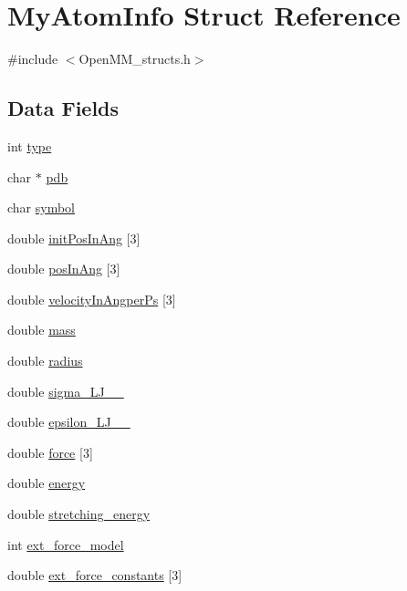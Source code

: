 \hypertarget{structMyAtomInfo}{}\section{My\+Atom\+Info Struct Reference}
\label{structMyAtomInfo}


{\ttfamily \#include $<$Open\+M\+M\+\_\+structs.\+h$>$}

\subsection*{Data Fields}
\begin{DoxyCompactItemize}
\item 
int \mbox{\hyperlink{structMyAtomInfo_aed11c9319e0ba5fd5d1d853393e5ca2a}{type}}
\item 
char $\ast$ \mbox{\hyperlink{structMyAtomInfo_a09e8a3f74dab18cb91d1262f8947d8e5}{pdb}}
\item 
char \mbox{\hyperlink{structMyAtomInfo_a89b16d994ac86606e6d73cf9fabe2b95}{symbol}}
\item 
double \mbox{\hyperlink{structMyAtomInfo_a8baed26db4167ce38492d90f2b2d313f}{init\+Pos\+In\+Ang}} \mbox{[}3\mbox{]}
\item 
double \mbox{\hyperlink{structMyAtomInfo_a3abe1ccbf133ad5722c6c0166127fced}{pos\+In\+Ang}} \mbox{[}3\mbox{]}
\item 
double \mbox{\hyperlink{structMyAtomInfo_a48cc3013502c5229b91779046e5f9a68}{velocity\+In\+Angper\+Ps}} \mbox{[}3\mbox{]}
\item 
double \mbox{\hyperlink{structMyAtomInfo_a9c73350529a9d3ca5693743adef8460a}{mass}}
\item 
double \mbox{\hyperlink{structMyAtomInfo_a712bfc36655e20c672039e77c382cb75}{radius}}
\item 
double \mbox{\hyperlink{structMyAtomInfo_a7a7974ff22785c7eb048f2e2f0a73ee8}{sigma\+\_\+\+L\+J\+\_\+\_}}
\item 
double \mbox{\hyperlink{structMyAtomInfo_a0e88ea2540579c4a4e4512dafe07ec3b}{epsilon\+\_\+\+L\+J\+\_\+\_}}
\item 
double \mbox{\hyperlink{structMyAtomInfo_a64c8685bb1f0ef2a309c2d6a7d570b73}{force}} \mbox{[}3\mbox{]}
\item 
double \mbox{\hyperlink{structMyAtomInfo_a946ebe88770470b856966af524d51b9c}{energy}}
\item 
double \mbox{\hyperlink{structMyAtomInfo_ac77461c452fb1aeb00ea6b021356bcbf}{stretching\+\_\+energy}}
\item 
int \mbox{\hyperlink{structMyAtomInfo_a8c95399f4e25caa9aab92a92e6567f6a}{ext\+\_\+force\+\_\+model}}
\item 
double \mbox{\hyperlink{structMyAtomInfo_a824f34f3589d9ad1d39622ad51e918c8}{ext\+\_\+force\+\_\+constants}} \mbox{[}3\mbox{]}
\end{DoxyCompactItemize}


